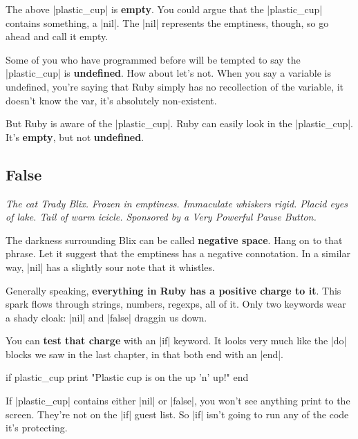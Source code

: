 \documentclass[12pt,twoside]{report}
\begin{document}
The above \rubyinline|plastic_cup| is {\bf empty}.
You could argue that the \rubyinline|plastic_cup|
contains something, a \rubyinline|nil|.  The
\rubyinline|nil| represents the emptiness, though, so
go ahead and call it empty.

Some of you who have programmed before will be tempted to say the
\rubyinline|plastic_cup| is {\bf undefined}.  How
about let's not.  When you say a variable is undefined, you're saying
that Ruby simply has no recollection of the variable, it doesn't know
the var, it's absolutely non-existent.

But Ruby is aware of the \rubyinline|plastic_cup|.
Ruby can easily look in the
\rubyinline|plastic_cup|. It's {\bf empty}, but not
          {\bf undefined}.



\subsection{False}




{\em The cat Trady Blix.  Frozen in emptiness.  Immaculate whiskers
  rigid.  Placid eyes of lake.  Tail of warm icicle.  Sponsored by a
  Very Powerful Pause Button.}

The darkness surrounding Blix can be called {\bf negative space}.
Hang on to that phrase. Let it suggest that the emptiness has a
negative connotation.  In a similar way,
\rubyinline|nil| has a slightly sour note that it
whistles.

Generally speaking, {\bf everything in Ruby has a positive charge to
  it}.  This spark flows through strings, numbers, regexps, all of it.
Only two keywords wear a shady cloak: \rubyinline|nil|
and \rubyinline|false| draggin us down.

You can {\bf test that charge} with an \rubyinline|if|
keyword.  It looks very much like the \rubyinline|do|
blocks we saw in the last chapter, in that both end with an
\rubyinline|end|.


\begin{rubycode}

 if plastic_cup 
   print "Plastic cup is on the up 'n' up!" 
 end

\end{rubycode}


If \rubyinline|plastic_cup| contains either
\rubyinline|nil| or
\rubyinline|false|, you won't see anything print to
the screen.  They're not on the \rubyinline|if| guest
list.  So \rubyinline|if| isn't going to run any of
the code it's protecting.
\end{document}
